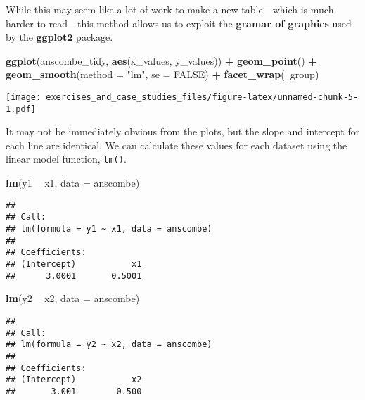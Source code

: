 \documentclass[]{book}
\newenvironment{Shaded}{\begin{snugshade}}{\end{snugshade}}
\newcommand{\DataTypeTok}[1]{\textcolor[rgb]{0.13,0.29,0.53}{#1}}
\newcommand{\KeywordTok}[1]{\textcolor[rgb]{0.13,0.29,0.53}{\textbf{#1}}}
\newcommand{\NormalTok}[1]{#1}
\newcommand{\OperatorTok}[1]{\textcolor[rgb]{0.81,0.36,0.00}{\textbf{#1}}}
\newcommand{\OtherTok}[1]{\textcolor[rgb]{0.56,0.35,0.01}{#1}}
\newcommand{\StringTok}[1]{\textcolor[rgb]{0.31,0.60,0.02}{#1}}
\theoremstyle{definition}
\theoremstyle{definition}
\theoremstyle{definition}
\theoremstyle{remark}
\begin{document}
While this may seem like a lot of work to make a new table---which is
much harder to read---this method allows us to exploit the
\textbf{gramar of graphics} used by the \textbf{ggplot2} package.

\begin{Shaded}
\begin{Highlighting}[]
\KeywordTok{ggplot}\NormalTok{(anscombe_tidy, }\KeywordTok{aes}\NormalTok{(x_values, y_values)) }\OperatorTok{+}
\StringTok{  }\KeywordTok{geom_point}\NormalTok{() }\OperatorTok{+}
\StringTok{  }\KeywordTok{geom_smooth}\NormalTok{(}\DataTypeTok{method =} \StringTok{"lm"}\NormalTok{, }\DataTypeTok{se =} \OtherTok{FALSE}\NormalTok{) }\OperatorTok{+}
\StringTok{  }\KeywordTok{facet_wrap}\NormalTok{(}\OperatorTok{~}\NormalTok{group)}
\end{Highlighting}
\end{Shaded}

\texttt{[image: exercises\_and\_case\_studies\_files/figure-latex/unnamed-chunk-5-1.pdf]}

It may not be immediately obvious from the plots, but the slope and
intercept for each line are identical. We can calculate these values for
each dataset using the linear model function, \texttt{lm()}.

\begin{Shaded}
\begin{Highlighting}[]
\KeywordTok{lm}\NormalTok{(y1 }\OperatorTok{~}\StringTok{ }\NormalTok{x1, }\DataTypeTok{data =}\NormalTok{ anscombe)}
\end{Highlighting}
\end{Shaded}

\begin{verbatim}
## 
## Call:
## lm(formula = y1 ~ x1, data = anscombe)
## 
## Coefficients:
## (Intercept)           x1  
##      3.0001       0.5001
\end{verbatim}

\begin{Shaded}
\begin{Highlighting}[]
\KeywordTok{lm}\NormalTok{(y2 }\OperatorTok{~}\StringTok{ }\NormalTok{x2, }\DataTypeTok{data =}\NormalTok{ anscombe)}
\end{Highlighting}
\end{Shaded}

\begin{verbatim}
## 
## Call:
## lm(formula = y2 ~ x2, data = anscombe)
## 
## Coefficients:
## (Intercept)           x2  
##       3.001        0.500
\end{verbatim}
\end{document}
